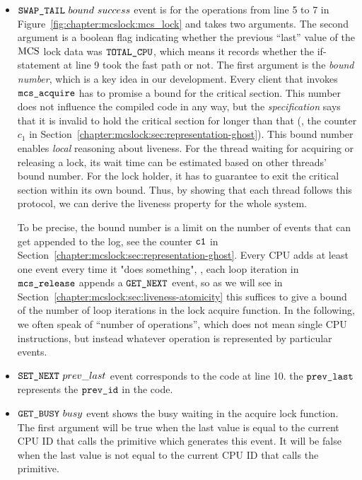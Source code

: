 \begin{itemize}

\item \textbf{${{\mathrm{\texttt{SWAP\_TAIL}}}~{bound}~{success}}$} event is for the
operations from line 5 to 7 in Figure~\ref{fig:chapter:mcslock:mcs_lock} and takes
two arguments. The second argument is a boolean flag indicating
whether the previous ``last'' value of the $\mathrm{MCS}$ lock data was ${\mathrm{\texttt{TOTAL\_CPU}}}$,
which means it records whether the if-statement at line 9 took the fast path or not.
The first argument is the \emph{bound number}, which is a key idea in
our development. Every client that invokes ${\mathrm{\texttt{mcs\_acquire}}}$ has
to promise a bound for the critical section. This number
does not influence the compiled code in any way, but the
\emph{specification} says that it is invalid to hold the critical
section for longer than that (\cf,  the counter $c_1$ in
Section~\ref{chapter:mcslock:sec:representation-ghost}).
This bound number enables \emph{local} reasoning about liveness.
For the thread waiting for acquiring or releasing a lock,
its wait time can be estimated based on other threads' bound number. For the lock holder, it has to guarantee
to exit the critical section within its own bound. 
Thus, by showing that each thread follows this protocol,
we can derive the liveness property for the whole system.

To be precise, the bound number is a limit on the number of events
that can get appended to the log, see the counter ${\mathrm{\texttt{c1}}}$ in
Section~\ref{chapter:mcslock:sec:representation-ghost}.
Every CPU adds at least
one event every time it "does something", \eg, each loop iteration in ${\mathrm{\texttt{mcs\_release}}}$ appends a ${\mathrm{\texttt{GET\_NEXT}}}$
event, so
as we will see in
Section~\ref{chapter:mcslock:sec:liveness-atomicity} this suffices to give a bound of the number of loop iterations in the lock acquire function. In the following, we often speak of
``number of operations'', which does not mean single CPU instructions,
but instead whatever operation is represented by particular events.



\item \textbf{${\mathrm{\texttt{SET\_NEXT}}}~{prev\_last}$} event corresponds to the code at line 10. 
the ${\mathrm{\texttt{prev\_last}}}$ represents the ${\mathrm{\texttt{prev\_id}}}$ in the code.

\item\textbf{${\mathrm{\texttt{GET\_BUSY}}}~{busy}$} event shows the busy waiting in the acquire lock function.
The first argument will be true when the last value is equal to the current CPU ID that calls the primitive which generates this event.
It will be false when the last value is not equal to the current CPU ID that calls the primitive.
\end{itemize}

